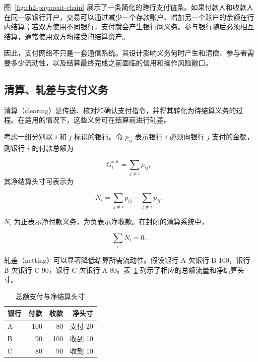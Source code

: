 图~\ref{fig:ch2-payment-chain} 展示了一条简化的跨行支付链条。如果付款人和收款人在同一家银行开户，交易可以通过减少一个存款账户、增加另一个账户的余额在行内结算；若双方使用不同银行，支付就会产生银行间义务。参与银行随后必须相互结算，通常使用双方均接受的结算资产。

因此，支付网络不只是一套通信系统。其设计影响义务何时产生和清偿、参与者需要多少流动性，以及结算最终完成之前面临的信用和操作风险敞口。

\subsection{清算、轧差与支付义务}

清算（clearing）是传送、核对和确认支付指令，并将其转化为待结算义务的过程。在适用的情况下，这些义务可在结算前进行轧差。

考虑一组分别以 $i$ 和 $j$ 标识的银行。令 $p_{ij}$ 表示银行 $i$ 必须向银行 $j$ 支付的金额，则银行 $i$ 的付款总额为

\begin{equation}
G_i^{\mathrm{out}}
=\sum_{j\neq i} p_{ij},
\label{eq:ch2-gross-outgoing}
\end{equation}
其净结算头寸可表示为

\begin{equation}
N_i=\sum_{j\neq i} p_{ij}-\sum_{j\neq i} p_{ji}.
\label{eq:ch2-net-position}
\end{equation}

$N_i$ 为正表示净付款义务，为负表示净收款。在封闭的清算系统中，

\begin{equation}
\sum_i N_i=0.
\label{eq:ch2-net-zero}
\end{equation}

轧差（netting）可以显著降低结算所需流动性。假设银行 A 欠银行 B 100，银行 B 欠银行 C 90，银行 C 欠银行 A 80。表~\ref{tab:ch2-netting-example} 列示了相应的总额流量和净结算头寸。

\begin{table}[H]
\centering
\caption{总额支付与净结算头寸}
\label{tab:ch2-netting-example}
\begin{tabular}{@{}lrrr@{}}
\toprule
\textbf{银行} & \textbf{付款} & \textbf{收款} & \textbf{净头寸} \\
\midrule
A & 100 & 80 & 支付 20 \\
B & 90 & 100 & 收到 10 \\
C & 80 & 90 & 收到 10 \\
\bottomrule
\end{tabular}
\end{table}

